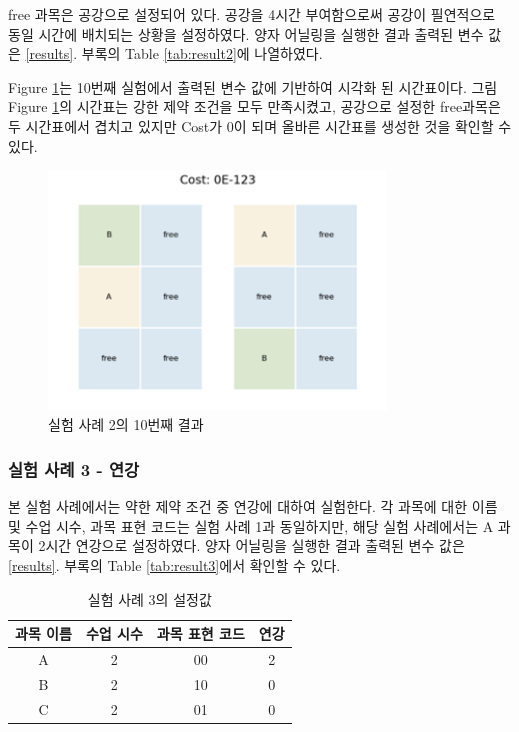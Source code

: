 \documentclass{article}
\begin{document}
free 과목은 공강으로 설정되어 있다. 공강을 4시간 부여함으로써 공강이 필연적으로 동일 시간에 배치되는 상황을 설정하였다. 양자 어닐링을 실행한 결과 출력된 변수 값은 \ref{results}. 부록의 Table \ref{tab:result2}에 나열하였다.

Figure \ref{fig:case2}는 10번째 실험에서 출력된 변수 값에 기반하여 시각화 된 시간표이다. 그림 Figure \ref{fig:case2}의 시간표는 강한 제약 조건을 모두 만족시켰고, 공강으로 설정한 free과목은 두 시간표에서 겹치고 있지만 Cost가 0이 되며 올바른 시간표를 생성한 것을 확인할 수 있다.

    \begin{figure}[htb!]
        \centering
        \includegraphics[width=0.8\textwidth]{images/Case2.png}
        \caption{실험 사례 2의 10번째 결과}
        \label{fig:case2}
    \end{figure}

    \subsubsection{실험 사례 3 - 연강}

본 실험 사례에서는 약한 제약 조건 중 연강에 대하여 실험한다. 각 과목에 대한 이름 및 수업 시수, 과목 표현 코드는 실험 사례 1과 동일하지만, 해당 실험 사례에서는 A 과목이 2시간 연강으로 설정하였다. 양자 어닐링을 실행한 결과 출력된 변수 값은 \ref{results}. 부록의 Table \ref{tab:result3}에서 확인할 수 있다.

    \begin{table}[htb!]
        \centering
        \begin{tabular}{c c c c}
             \hline
             과목 이름 & 수업 시수 & 과목 표현 코드 & 연강\\
             \hline
             A & 2 & 00 & 2\\
             B & 2 & 10 & 0\\
             C & 2 & 01 & 0\\
             \hline
        \end{tabular}
        \caption{실험 사례 3의 설정값}\label{tab:testcase3}
    \end{table}
\end{document}
